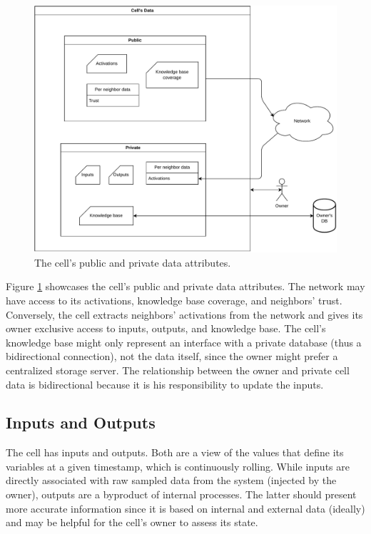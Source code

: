 \begin{figure}[h!]
    \centering
    \includegraphics[width=\linewidth]{figures/chapter4/cell/data.pdf}
    \caption{The cell's public and private data attributes.}
    \label{fig:celldata}
\end{figure}

Figure \ref{fig:celldata} showcases the cell's public and private data attributes. The network may have access to its activations, knowledge base coverage, and neighbors' trust. Conversely, the cell extracts neighbors' activations from the network and gives its owner exclusive access to inputs, outputs, and knowledge base. The cell's knowledge base might only represent an interface with a private database (thus a bidirectional connection), not the data itself, since the owner might prefer a centralized storage server. The relationship between the owner and private cell data is bidirectional because it is his responsibility to update the inputs.



\subsection{Inputs and Outputs}

The cell has inputs and outputs. Both are a view of the values that define its variables at a given timestamp, which is continuously rolling. While inputs are directly associated with raw sampled data from the system (injected by the owner), outputs are a byproduct of internal processes. The latter should present more accurate information since it is based on internal and external data (ideally) and may be helpful for the cell's owner to assess its state.

